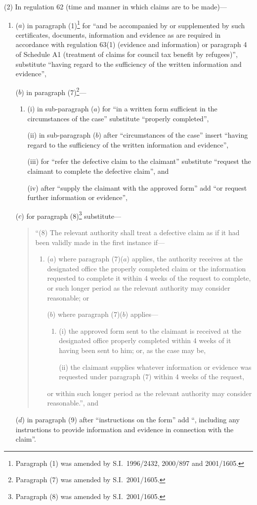 \documentclass[12pt,a4paper]{article}
\begin{document}
(2) In regulation 62 (time and manner in which claims are to be made)—
\begin{enumerate}\item[]
($a$) in paragraph (1)\footnote{Paragraph (1) was amended by S.I.\ 1996/2432, 2000/897 and 2001/1605.} for “and be accompanied by or supplemented by such certificates, documents, information and evidence as are required in accordance with regulation 63(1) (evidence and information) or paragraph 4 of Schedule A1 (treatment of claims for council tax benefit by refugees)”, substitute “having regard to the sufficiency of the written information and evidence”,

($b$) in paragraph (7)\footnote{Paragraph (7) was amended by S.I.\ 2001/1605.}—
\begin{enumerate}\item[]
(i) in sub-paragraph ($a$)  for “in a written form sufficient in the circumstances of the case” substitute “properly completed”,

(ii) in sub-paragraph ($b$)  after “circumstances of the case” insert “having regard to the sufficiency of the written information and evidence”,

(iii) for “refer the defective claim to the claimant” substitute “request the claimant to complete the defective claim”, and

(iv) after “supply the claimant with the approved form” add “or request further information or evidence”,
\end{enumerate}

($c$) for paragraph (8)\footnote{Paragraph (8) was amended by S.I.\ 2001/1605.} substitute—
\begin{quotation}
“(8) The relevant authority shall treat a defective claim as if it had been validly made in the first instance if—
\begin{enumerate}\item[]
($a$) where paragraph (7)($a$)  applies, the authority receives at the designated office the properly completed claim or the information requested to complete it within 4 weeks of the request to complete, or such longer period as the relevant authority may consider reasonable; or

($b$) where paragraph (7)($b$)  applies—
\begin{enumerate}\item[]
(i) the approved form sent to the claimant is received at the designated office properly completed within 4 weeks of it having been sent to him; or, as the case may be,

(ii) the claimant supplies whatever information or evidence was requested under paragraph (7) within 4 weeks of the request,
\end{enumerate}
or within such longer period as the relevant authority may consider reasonable.”, and
\end{enumerate}
\end{quotation}

($d$) in paragraph (9) after “instructions on the form” add “, including any instructions to provide information and evidence in connection with the claim”.
\end{enumerate}
\end{document}
